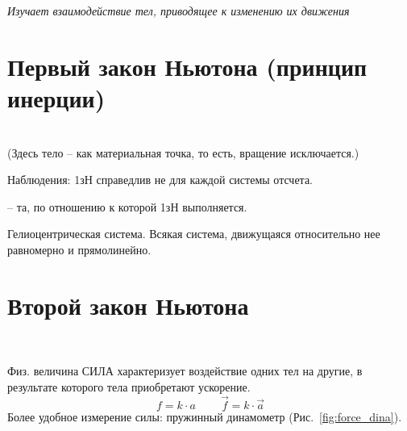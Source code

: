 \sf\Large


\centerline{\sl Изучает взаимодействие тел, приводящее к изменению их движения}
\vspace{2mm}
\section{Первый закон Ньютона (принцип инерции)}

\begin{center}
\\[1mm]
(Здесь тело -- как материальная точка, то есть, вращение исключается.)
\end{center}

Наблюдения: 1зН справедлив не для каждой системы отсчета.

 -- та, по отношению к которой 1зН выполняется.

Гелиоцентрическая система. Всякая система, движущаяся относительно нее равномерно и прямолинейно.
\\

\section{Второй закон Ньютона}


\begin{center}
\\[1mm]
\end{center}
Физ. величина СИЛА характеризует воздействие одних тел на другие, в результате которого тела приобретают ускорение.
\begin{displaymath}
 f=k\cdot a\;\;\;\;\;\;\;\;\vec{f}=k\cdot\vec{a}
 \end{displaymath}
Более удобное измерение силы: пружинный динамометр (Рис.~\ref{fig:force_dina}).\\
 
